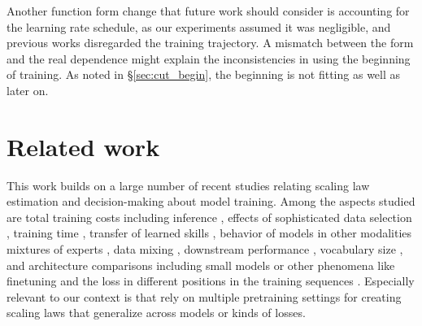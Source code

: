 \documentclass{article}
\theoremstyle{plain}
\theoremstyle{definition}
\theoremstyle{remark}
\begin{document}
Another function form change that future work should consider is accounting for the learning rate schedule, as our experiments assumed it was negligible, and previous works disregarded the training trajectory. 
A mismatch between the form and the real dependence might explain the inconsistencies in using the beginning of training. As noted in \S\ref{sec:cut_begin}, the beginning is not fitting as well as later on.%



\section{Related work}\label{sec:related}

This work builds on a large number of recent studies relating scaling law estimation and decision-making about model training.
Among the aspects studied are total training costs including inference \citep{sardanabeyond}, effects of sophisticated data selection \citep{sorscher2022beyond,bimix}, training time \citep{inbar2024time}, transfer of learned skills \citep{hernandez2021scaling}, behavior of models in other modalities \citep{mikami2022scaling,abnarexploring,alabdulmohsin2024getting,hesslow2022rita} mixtures of experts \citep{ludziejewskiscaling}, data mixing \citep{bimix}, downstream performance \citep{datablations}, vocabulary size \citep{tao2024scaling}, and architecture comparisons \citep{tay2023scaling,poli2024mechanisticdesignscalinghybrid} including small models \citep{muckatira-etal-2024-emergent} or other phenomena like finetuning \citep{zhangscaling} and the loss in different positions in the training sequences \citep{Xiong2024TemporalSL}.
Especially relevant to our context is \citet{ruan2024observational,polo2024sloth} that rely on multiple pretraining settings for creating scaling laws that generalize across models or kinds of losses. 
\end{document}
